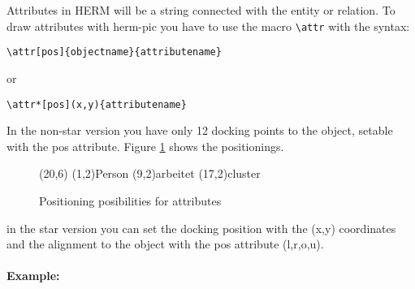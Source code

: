 \documentclass[a4paper,11pt]{article}
\begin{document}
Attributes in HERM will be a string connected with the entity or relation.
To draw attributes with herm-pic you have to use the macro \verb|\attr| with the syntax:

\begin{verbatim}
\attr[pos]{objectname}{attributename}
\end{verbatim}

or

\begin{verbatim}
\attr*[pos](x,y){attributename}
\end{verbatim}

In the non-star version you have only 12 docking points to the object, setable with the pos attribute.
Figure \ref{fig:attr_pos} shows the positionings.

\begin{figure}[htb]
  \centering
  \begin{schema}(20,6)
  \entity(1,2){Person}
  \relation(9,2){arbeitet}
  \cluster(17,2){cluster}
\end{schema}

  \caption{Positioning posibilities for attributes}
  \label{fig:attr_pos}
\end{figure}

in the star version you can set the docking position with the (x,y) coordinates
and the alignment to the object with the pos attribute (l,r,o,u).

\paragraph{Example:}
\end{document}
